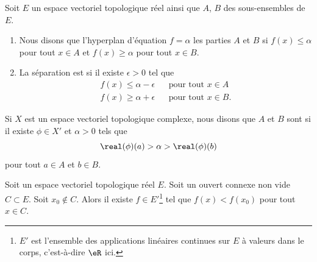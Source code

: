 \begin{definition}		\label{DEFooQUDEooMrgcCV}
	Soit \( E\) un espace vectoriel topologique réel ainsi que \( A\), \( B\) des sous-ensembles de \( E\).
	\begin{enumerate}
		\item
		      Nous disons que l'hyperplan d'équation \( f=\alpha\)  les parties \( A\) et \( B\) si \( f(x)\leq \alpha\) pour tout \( x\in A\) et \( f(x)\geq \alpha\) pour tout \( x\in B\).
		\item
		      La séparation est  si il existe \( \epsilon>0\) tel que
		      \begin{subequations}
			      \begin{align}
				      f(x)\leq \alpha-\epsilon &  & \text{pour tout } x\in A  \\
				      f(x)\geq \alpha+\epsilon &  & \text{pour tout } x\in B.
			      \end{align}
		      \end{subequations}
	\end{enumerate}

	Si \( X\) est un espace vectoriel topologique complexe, nous disons que \( A\) et \( B\) sont  si il existe \( \phi\in X'\) et \( \alpha>0\) tels que
	\begin{equation}
		\real (\phi)(a)>\alpha>\real(\phi)(b)
	\end{equation}
	pour tout \( a\in A\) et \( b\in B\).
\end{definition}


\begin{proposition}	\label{PROPooSKBXooQDOmcL}
	Soit un espace vectoriel topologique réel \( E\). Soit un ouvert connexe non vide \( C\subset E\). Soit \( x_0\not\in C\). Alors il existe \( f\in E'\)\footnote{\( E'\) est l'ensemble des applications linéaires continues sur \( E\) à valeurs dans le corps, c'est-à-dire \( \eR\) ici.} tel que \( f(x)<f(x_0)\) pour tout \( x\in C\).
\end{proposition}

